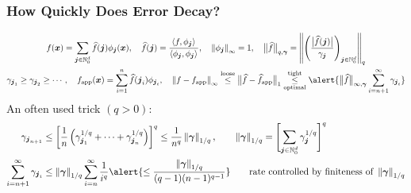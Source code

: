 \documentclass[11pt,compress,xcolor={usenames,dvipsnames},aspectratio=169]{beamer}
\newcommand{\fappx}{f_{\text{app}}}
\newcommand{\hfappx}{\widehat{f}_{\text{app}}}
\begin{document}
\begin{frame}
\frametitle{How Quickly Does Error Decay?}
\vspace{-7ex}
\begin{gather*}
f(\vx) = \sum_{\vj \in \natzero^d} \hf(\vj) \phi_{\vj}(\vx), \quad \hf(\vj) = \frac{\ip{f}{\phi_{\vj}}}{\ip{\phi_{\vj}}{\phi_{\vj}}}, 
  \quad \norm[\infty]{\phi_{\vj}}=1, \quad
\bignorm[q,\vgamma]{\hf} = \norm[q]{\left( \frac{\bigabs{\hf(\vj)}}{\gamma_{\vj}} \right)_{\vj \in \natzero^d}}
\\
\gamma_{\vj_1} \ge \gamma_{\vj_2} \ge \cdots, \quad
\fappx(\vx) = \sum_{i=1}^{n} \hf(\vj_i) \phi_{\vj_i}, \quad
\norm[\infty]{f - \fappx}
\overset{\text{loose}}{\le}  \bignorm[1]{\hf - \hfappx} \underset{\text{optimal}}{\overset{\text{tight}}{\le}} 
\alert{\bignorm[\infty,\vgamma]{\hf} \sum_{i = n+1}^{\infty}  \gamma_{\vj_{i}}}
\end{gather*}
An often used trick $(q > 0)$:
\begin{align*}
	\gamma_{\vj_{n+1}} &\le \left[\frac1n \left(\gamma_{\vj_1}^{1/q} + \cdots +  \gamma_{\vj_n}^{1/q}  \right) \right]^q \le \frac {1}{n^q} \norm[1/q]{\vgamma},   \qquad \norm[1/q]{\vgamma} = \Biggl[ \sum_{\vj \in \natzero^d} \gamma_{\vj}^{1/q} \Biggr]^q\\
	\sum_{i = n+1}^{\infty}  \gamma_{\vj_{i}} 
	& \le   \norm[1/q]{\vgamma} \sum_{i=n}^\infty \frac{1}{i^q} \alert{\le \frac{ \norm[1/q]{\vgamma}}{(q-1) (n-1)^{q-1}}} \qquad \text{rate controlled by finiteness of } \norm[1/q]{\vgamma}
\end{align*}
\end{frame}
\end{document}
